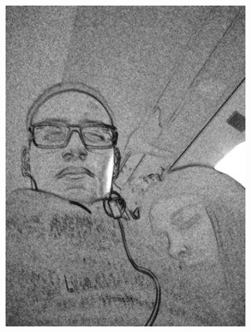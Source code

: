 \documentclass[12pt, a4paper]{article}
\begin{document}
\begin{figure}[!h]
\begin{subfigure}[b]{0.3\textwidth}
  \includegraphics[width=1\textwidth]{report_src/art/ricMay.jpeg}
\end{subfigure}
  \end{figure} 
\end{document}
